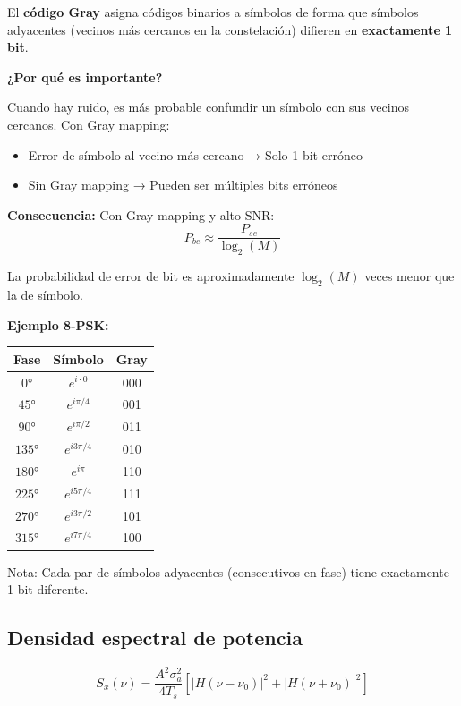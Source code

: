 \documentclass[10pt,a4paper]{article}
\begin{document}
\begin{tcolorbox}[colback=azulclaro!10,colframe=azuloscuro,title=Principio]
El \textbf{código Gray} asigna códigos binarios a símbolos de forma que símbolos adyacentes (vecinos más cercanos en la constelación) difieren en \textbf{exactamente 1 bit}.

\textbf{¿Por qué es importante?}

Cuando hay ruido, es más probable confundir un símbolo con sus vecinos cercanos. Con Gray mapping:
\begin{itemize}
\item Error de símbolo al vecino más cercano → Solo 1 bit erróneo
\item Sin Gray mapping → Pueden ser múltiples bits erróneos
\end{itemize}

\textbf{Consecuencia:} Con Gray mapping y alto SNR:
$$P_{be} \approx \frac{P_{se}}{\log_2(M)}$$

La probabilidad de error de bit es aproximadamente $\log_2(M)$ veces menor que la de símbolo.

\textbf{Ejemplo 8-PSK:}
\begin{center}
\begin{tabular}{|c|c|c|}
\hline
Fase & Símbolo & Gray \\
\hline
$0°$ & $e^{i\cdot 0}$ & 000 \\
$45°$ & $e^{i\pi/4}$ & 001 \\
$90°$ & $e^{i\pi/2}$ & 011 \\
$135°$ & $e^{i3\pi/4}$ & 010 \\
$180°$ & $e^{i\pi}$ & 110 \\
$225°$ & $e^{i5\pi/4}$ & 111 \\
$270°$ & $e^{i3\pi/2}$ & 101 \\
$315°$ & $e^{i7\pi/4}$ & 100 \\
\hline
\end{tabular}
\end{center}

Nota: Cada par de símbolos adyacentes (consecutivos en fase) tiene exactamente 1 bit diferente.
\end{tcolorbox}

\subsection{Densidad espectral de potencia}

$$S_x(\nu) = \frac{A^2\sigma_a^2}{4T_s}\left[|H(\nu-\nu_0)|^2 + |H(\nu+\nu_0)|^2\right]$$
\end{document}
